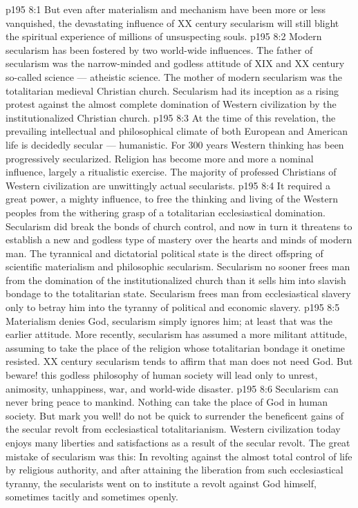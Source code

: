 \vs p195 8:1 But even after materialism and mechanism have been more or less vanquished, the devastating influence of XX century secularism will still blight the spiritual experience of millions of unsuspecting souls.
\vs p195 8:2 Modern secularism has been fostered by two world\hyp{}wide influences. The father of secularism was the narrow\hyp{}minded and godless attitude of XIX and XX century so\hyp{}called science --- atheistic science. The mother of modern secularism was the totalitarian medieval Christian church. Secularism had its inception as a rising protest against the almost complete domination of Western civilization by the institutionalized Christian church.
\vs p195 8:3 At the time of this revelation, the prevailing intellectual and philosophical climate of both European and American life is decidedly secular --- humanistic. For 300 years Western thinking has been progressively secularized. Religion has become more and more a nominal influence, largely a ritualistic exercise. The majority of professed Christians of Western civilization are unwittingly actual secularists.
\vs p195 8:4 It required a great power, a mighty influence, to free the thinking and living of the Western peoples from the withering grasp of a totalitarian ecclesiastical domination. Secularism did break the bonds of church control, and now in turn it threatens to establish a new and godless type of mastery over the hearts and minds of modern man. The tyrannical and dictatorial political state is the direct offspring of scientific materialism and philosophic secularism. Secularism no sooner frees man from the domination of the institutionalized church than it sells him into slavish bondage to the totalitarian state. Secularism frees man from ecclesiastical slavery only to betray him into the tyranny of political and economic slavery.
\vs p195 8:5 \pc Materialism denies God, secularism simply ignores him; at least that was the earlier attitude. More recently, secularism has assumed a more militant attitude, assuming to take the place of the religion whose totalitarian bondage it onetime resisted. XX century secularism tends to affirm that man does not need God. But beware! this godless philosophy of human society will lead only to unrest, animosity, unhappiness, war, and world\hyp{}wide disaster.
\vs p195 8:6 \pc Secularism can never bring peace to mankind. Nothing can take the place of God in human society. But mark you well! do not be quick to surrender the beneficent gains of the secular revolt from ecclesiastical totalitarianism. Western civilization today enjoys many liberties and satisfactions as a result of the secular revolt. The great mistake of secularism was this: In revolting against the almost total control of life by religious authority, and after attaining the liberation from such ecclesiastical tyranny, the secularists went on to institute a revolt against God himself, sometimes tacitly and sometimes openly.
